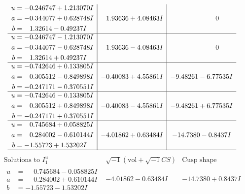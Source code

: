\documentclass[1p]{elsarticle_modified}
\theoremstyle{definition}
\newcommand{\I}{\sqrt{-1}}
\begin{document}
$$\begin{array}{c|c|c}
\begin{aligned}
u &= -0.246747 + 1.213070 I \\
a &= -0.344077 + 0.628748 I \\
b &= \phantom{-}1.32614 - 0.49237 I\end{aligned}
 & \phantom{-}1.93636 + 4.08463 I & \phantom{-0.000000 } 0 \\ \hline\begin{aligned}
u &= -0.246747 - 1.213070 I \\
a &= -0.344077 - 0.628748 I \\
b &= \phantom{-}1.32614 + 0.49237 I\end{aligned}
 & \phantom{-}1.93636 - 4.08463 I & \phantom{-0.000000 } 0 \\ \hline\begin{aligned}
u &= -0.742646 + 0.133805 I \\
a &= \phantom{-}0.305512 - 0.849898 I \\
b &= -0.247171 - 0.370551 I\end{aligned}
 & -0.40083 + 4.55861 I & -9.48261 - 6.77535 I \\ \hline\begin{aligned}
u &= -0.742646 - 0.133805 I \\
a &= \phantom{-}0.305512 + 0.849898 I \\
b &= -0.247171 + 0.370551 I\end{aligned}
 & -0.40083 - 4.55861 I & -9.48261 + 6.77535 I \\ \hline\begin{aligned}
u &= \phantom{-}0.745684 + 0.058825 I \\
a &= \phantom{-}0.284002 - 0.610144 I \\
b &= -1.55723 + 1.53202 I\end{aligned}
 & -4.01862 + 0.63484 I & -14.7380 - 0.8437 I\\
 \hline 
 \end{array}$$\newpage$$\begin{array}{c|c|c}  
\text{Solutions to }I^u_{1}& \I (\text{vol} + \sqrt{-1}CS) & \text{Cusp shape}\\
 \hline 
\begin{aligned}
u &= \phantom{-}0.745684 - 0.058825 I \\
a &= \phantom{-}0.284002 + 0.610144 I \\
b &= -1.55723 - 1.53202 I\end{aligned}
 & -4.01862 - 0.63484 I & -14.7380 + 0.8437 I \\ \hline\begin{aligned}

\end{aligned}
\end{array}$$
\end{document}
